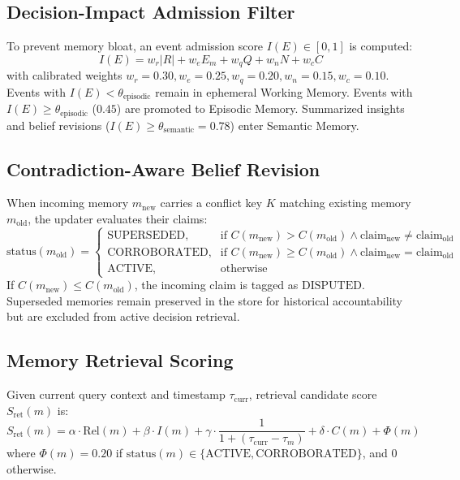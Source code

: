 \documentclass[conference]{IEEEtran}
\begin{document}
\subsection{Decision-Impact Admission Filter}
To prevent memory bloat, an event admission score $I(E) \in [0, 1]$ is computed:
\begin{equation}
I(E) = w_r |R| + w_e E_m + w_q Q + w_n N + w_c C
\label{eq:importance}
\end{equation}
with calibrated weights $w_r=0.30, w_e=0.25, w_q=0.20, w_n=0.15, w_c=0.10$. Events with $I(E) < \theta_{\text{episodic}}$ remain in ephemeral Working Memory. Events with $I(E) \ge \theta_{\text{episodic}}$ ($0.45$) are promoted to Episodic Memory. Summarized insights and belief revisions ($I(E) \ge \theta_{\text{semantic}} = 0.78$) enter Semantic Memory.

\subsection{Contradiction-Aware Belief Revision}
When incoming memory $m_{\text{new}}$ carries a conflict key $K$ matching existing memory $m_{\text{old}}$, the updater evaluates their claims:
\begin{equation}
\text{status}(m_{\text{old}}) = 
\begin{cases}
\text{SUPERSEDED}, & \text{if } C(m_{\text{new}}) > C(m_{\text{old}}) \land \text{claim}_{\text{new}} \neq \text{claim}_{\text{old}} \\
\text{CORROBORATED}, & \text{if } C(m_{\text{new}}) \ge C(m_{\text{old}}) \land \text{claim}_{\text{new}} = \text{claim}_{\text{old}} \\
\text{ACTIVE}, & \text{otherwise}
\end{cases}
\end{equation}
If $C(m_{\text{new}}) \le C(m_{\text{old}})$, the incoming claim is tagged as $\text{DISPUTED}$. Superseded memories remain preserved in the store for historical accountability but are excluded from active decision retrieval.

\subsection{Memory Retrieval Scoring}
Given current query context and timestamp $\tau_{\text{curr}}$, retrieval candidate score $S_{\text{ret}}(m)$ is:
\begin{equation}
S_{\text{ret}}(m) = \alpha \cdot \text{Rel}(m) + \beta \cdot I(m) + \gamma \cdot \frac{1}{1 + (\tau_{\text{curr}} - \tau_m)} + \delta \cdot C(m) + \Phi(m)
\end{equation}
where $\Phi(m) = 0.20$ if $\text{status}(m) \in \{\text{ACTIVE}, \text{CORROBORATED}\}$, and $0$ otherwise.
\end{document}
